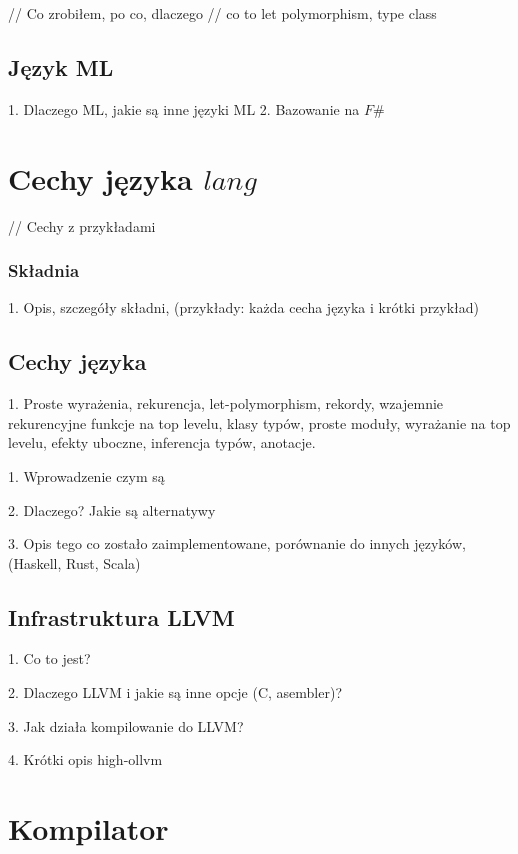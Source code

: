 \documentclass[declaration,shortabstract]{iithesis}
\begin{document}
// Co zrobiłem, po co, dlaczego
// co to {let polymorphism, type class}
\section{Język ML}
1. Dlaczego ML, jakie są inne języki ML
2. Bazowanie na $ F\# $


\chapter{Cechy języka $lang$}

// Cechy z przykładami


\subsection{Składnia}

1. Opis, szczegóły składni, (przykłady: każda cecha języka i krótki przykład)

\section{Cechy języka}

1. Proste wyrażenia, rekurencja, let-polymorphism, rekordy,
wzajemnie rekurencyjne funkcje na top levelu, klasy typów, proste moduły, 
wyrażanie na top levelu, efekty uboczne, inferencja typów, anotacje.


1. Wprowadzenie czym są 

2. Dlaczego? Jakie są alternatywy

3. Opis tego co zostało zaimplementowane, porównanie do innych języków, (Haskell,
Rust, Scala)

\section{Infrastruktura LLVM}

1. Co to jest? 

2. Dlaczego LLVM i jakie są inne opcje (C, asembler)? 

3. Jak działa kompilowanie do LLVM? 

4. Krótki opis high-ollvm 

\chapter{Kompilator}
\end{document}
